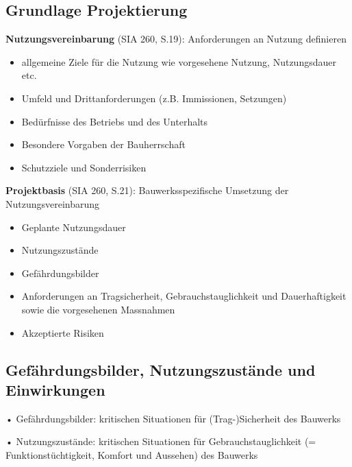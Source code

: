 

	\begin{multicols}{2}
		\section{Grundlage Projektierung}
			\textbf{Nutzungsvereinbarung} (SIA 260, S.19): Anforderungen an Nutzung definieren
				\begin{itemize}
					
					\item allgemeine Ziele für die Nutzung wie
					vorgesehene Nutzung, Nutzungsdauer etc.
					\item Umfeld und Drittanforderungen (z.B.
					Immissionen, Setzungen)
					\item Bedürfnisse des Betriebs und des Unterhalts
					\item Besondere Vorgaben der Bauherrschaft
					\item Schutzziele und Sonderrisiken
										
				\end{itemize}			
		
		\medskip
		
			\textbf{Projektbasis} (SIA 260, S.21): Bauwerksspezifische Umsetzung der
			Nutzungsvereinbarung
			\begin{itemize}
				
				\item Geplante Nutzungsdauer
				\item Nutzungszustände
				\item Gefährdungsbilder
				\item Anforderungen an Tragsicherheit, Gebrauchstauglichkeit und Dauerhaftigkeit sowie die vorgesehenen Massnahmen
				\item Akzeptierte Risiken
				
			\end{itemize}
		
	
	
			\subsection{Gefährdungsbilder, Nutzungszustände und Einwirkungen}
			
			• Gefährdungsbilder: kritischen
			Situationen für (Trag-)Sicherheit des
			Bauwerks
			
			• Nutzungszustände: kritischen
			Situationen für Gebrauchstauglichkeit
			(= Funktionstüchtigkeit, Komfort und
			Aussehen) des Bauwerks
			

\end{multicols}
